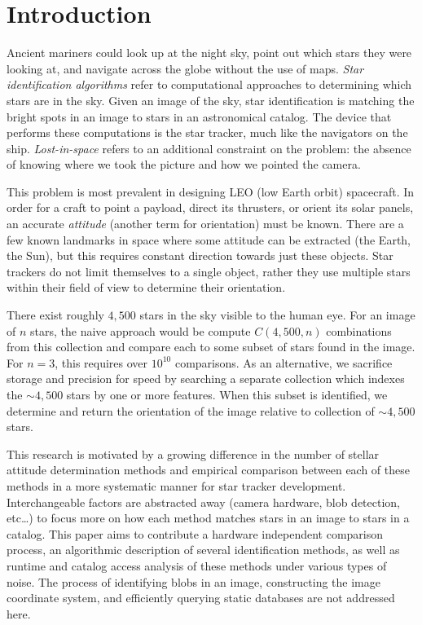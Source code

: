 \section{Introduction}\label{sec:introduction}
Ancient mariners could look up at the night sky, point out which stars they were looking at, and navigate across the
globe without the use of maps.
\textit{Star identification algorithms} refer to computational approaches to determining which stars are in the sky.
Given an image of the sky, star identification is matching the bright spots in an image to stars in an astronomical
catalog.
The device that performs these computations is the star tracker, much like the navigators on the ship.
\textit{Lost-in-space} refers to an additional constraint on the problem: the absence of knowing where we took
the picture and how we pointed the camera.

This problem is most prevalent in designing LEO (low Earth orbit) spacecraft.
In order for a craft to point a payload, direct its thrusters, or orient its solar panels, an accurate
\textit{attitude} (another term for orientation) must be known.
There are a few known landmarks in space where some attitude can be extracted (the Earth, the Sun), but this
requires constant direction towards just these objects.
Star trackers do not limit themselves to a single object, rather they use multiple stars within their field of view
to determine their orientation.

\newcommand{\seq}{\!=\!}
There exist roughly $4{,}500$ stars in the sky visible to the human eye.
For an image of $n$ stars, the naive approach would be compute $C(4{,}500, n)$ combinations from this collection and
compare each to some subset of stars found in the image.
For $n\seq 3$, this requires over $10^{10}$ comparisons.
As an alternative, we sacrifice storage and precision for speed by searching a separate collection which indexes the
${\sim}4{,}500$ stars by one or more features.
When this subset is identified, we determine and return the orientation of the image relative to collection
of ${\sim}4{,}500$ stars.

This research is motivated by a growing difference in the number of stellar attitude determination methods and
empirical comparison between each of these methods in a more systematic manner for star tracker development.
Interchangeable factors are abstracted away (camera hardware, blob detection, etc\ldots) to focus more on how each
method matches stars in an image to stars in a catalog.
This paper aims to contribute a hardware independent comparison process, an algorithmic description of several
identification methods, as well as runtime and catalog access analysis of these methods under various types of noise.
The process of identifying blobs in an image, constructing the image coordinate system, and efficiently querying
static databases are not addressed here.
